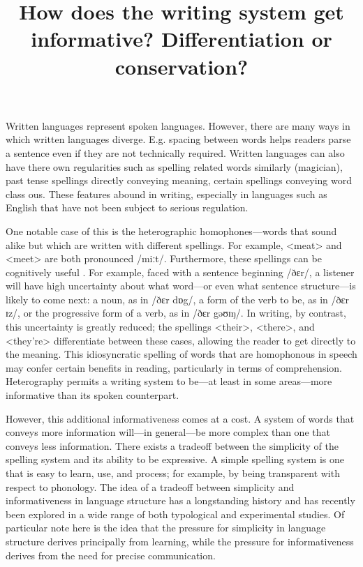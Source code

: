 \documentclass[doc,biblatex]{apa7}
\title{How does the writing system get informative? Differentiation or conservation?}
\begin{document}
\maketitle

\noindent
Written languages represent spoken languages. However, there are many ways in which written languages diverge. E.g. spacing between words helps readers parse a sentence even if they are not technically required. Written languages can also have there own regularities such as spelling related words similarly (magician), past tense spellings directly conveying meaning, certain spellings conveying word class ous. These features abound in writing, especially in languages such as English that have not been subject to serious regulation.

One notable case of this is the heterographic homophones---words that sound alike but which are written with different spellings. For example, <meat> and <meet> are both pronounced /miːt/. Furthermore, these spellings can be cognitively useful . For example, faced with a sentence beginning /ðɛr/, a listener will have high uncertainty about what word---or even what sentence structure---is likely to come next: a noun, as in /ðɛr dɒg/, a form of the verb to be, as in /ðɛr ɪz/, or the progressive form of a verb, as in /ðɛr gəʊɪŋ/. In writing, by contrast, this uncertainty is greatly reduced; the spellings <their>, <there>, and <they're> differentiate between these cases, allowing the reader to get directly to the meaning. This idiosyncratic spelling of words that are homophonous in speech may confer certain benefits in reading, particularly in terms of comprehension. Heterography permits a writing system to be---at least in some areas---more informative than its spoken counterpart.

However, this additional informativeness comes at a cost. A system of words that conveys more information will---in general---be more complex than one that conveys less information. There exists a tradeoff between the simplicity of the spelling system and its ability to be expressive. A simple spelling system is one that is easy to learn, use, and process; for example, by being transparent with respect to phonology. The idea of a tradeoff between simplicity and informativeness in language structure has a longstanding history \parencite{Gabelentz:1891, Zipf:1949, Martinet:1952, Rosch:1978} and has recently been explored in a wide range of both typological \parencite{KempRegier:2012, Kemp:2018} and experimental \parencite{Carr:2020, Kirby:2015} studies. Of particular note here is the idea that the pressure for simplicity in language structure derives principally from learning, while the pressure for informativeness derives from the need for precise communication.
\end{document}
